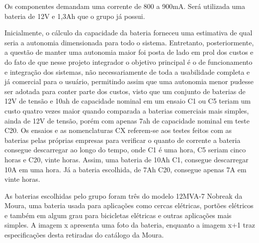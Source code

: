 Os componentes demandam uma corrente de 800 a 900mA. Será utilizada uma bateria de 12V e 1,3Ah que o grupo já possui.

Inicialmente, o cálculo da capacidade da bateria forneceu uma estimativa de qual seria a autonomia dimensionada para todo o sistema. Entretanto, posteriormente, a questão de manter uma autonomia maior foi posta de lado em prol dos custos e do fato de que nesse projeto integrador o objetivo principal é o de funcionamento e integração dos sistemas, não necessariamente de toda a usabilidade completa e já comercial para o usuário, permitindo assim que uma autonomia menor pudesse ser adotada para conter parte dos custos, visto que um conjunto de baterias de 12V de tensão e 10ah de capacidade nominal em um ensaio C1 ou C5 teriam um custo quatro vezes maior quando comparada a baterias comerciais mais simples, ainda de 12V de tensão, porém com apenas 7ah de capacidade nominal em teste C20. Os ensaios e as nomenclaturas CX referem-se aos testes feitos com as baterias pelas próprias empresas para verificar o quanto de corrente a bateria consegue descarregar ao longo do tempo, onde C1 é uma hora, C5 seriam cinco horas e C20, vinte horas. Assim, uma bateria de 10Ah C1, consegue descarregar 10A em uma hora. Já a bateria escolhida, de 7Ah C20, consegue apenas 7A em vinte horas.

As baterias escolhidas pelo grupo foram três do modelo 12MVA-7 Nobreak da Moura, uma bateria usada para aplicações como cercas elétricas, portões elétricos e também em algum grau para bicicletas elétricas e outras aplicações mais simples. A imagem x apresenta uma foto da bateria, enquanto a imagem x+1 traz especificações desta retiradas do catálogo da Moura.

\newpage

